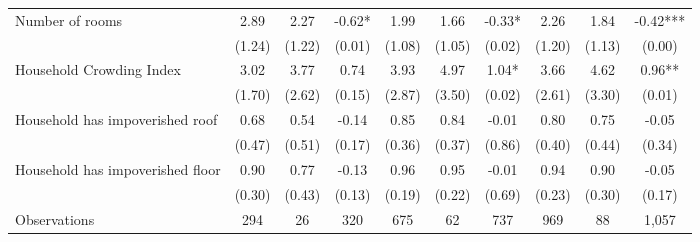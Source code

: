 \begin{tabular}{l*{9}c}
Number of rooms&2.89&2.27&-0.62*&1.99&1.66&-0.33*&2.26&1.84&-0.42***\\
&(1.24)&(1.22)&(0.01)&(1.08)&(1.05)&(0.02)&(1.20)&(1.13)&(0.00)\\
Household Crowding Index&3.02&3.77&0.74&3.93&4.97&1.04*&3.66&4.62&0.96**\\
&(1.70)&(2.62)&(0.15)&(2.87)&(3.50)&(0.02)&(2.61)&(3.30)&(0.01)\\
Household has impoverished roof&0.68&0.54&-0.14&0.85&0.84&-0.01&0.80&0.75&-0.05\\
&(0.47)&(0.51)&(0.17)&(0.36)&(0.37)&(0.86)&(0.40)&(0.44)&(0.34)\\
Household has impoverished floor&0.90&0.77&-0.13&0.96&0.95&-0.01&0.94&0.90&-0.05\\
&(0.30)&(0.43)&(0.13)&(0.19)&(0.22)&(0.69)&(0.23)&(0.30)&(0.17)\\
\hline
Observations & 294 & 26 & 320 & 675 & 62 & 737 & 969 & 88 & 1,057 \\
\hline\hline
\end{tabular}
